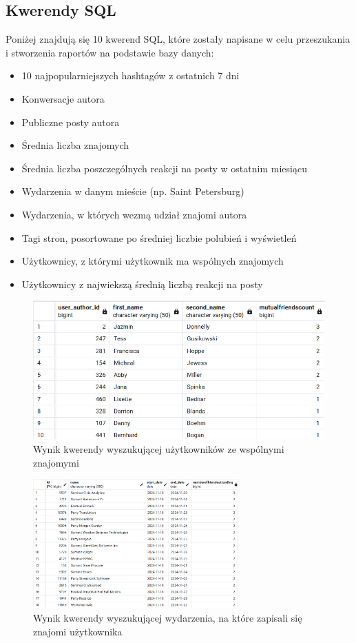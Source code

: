 \documentclass{article}
\begin{document}
\subsection{Kwerendy SQL}
\quad Poniżej znajdują się 10 kwerend SQL, które zostały napisane w celu przeszukania i stworzenia raportów na podstawie bazy danych:

\begin{itemize}
    \item 10 najpopularniejszych hashtagów z ostatnich 7 dni
    \item Konwersacje autora
    \item Publiczne posty autora
    \item Średnia liczba znajomych
    \item Średnia liczba poszczególnych reakcji na posty w ostatnim miesiącu
    \item Wydarzenia w danym mieście (np. Saint Petersburg)
    \item Wydarzenia, w których wezmą udział znajomi autora
    \item Tagi stron, posortowane po średniej liczbie polubień i wyświetleń
    \item Użytkownicy, z którymi użytkownik ma wspólnych znajomych
    \item Użytkownicy z najwiekszą średnią liczbą reakcji na posty
\end{itemize}

\begin{figure}[H]
    \centering
    \includegraphics[width=\textwidth]{images/mutual_friends_sql.png}
    \caption{Wynik kwerendy wyszukującej użytkowników ze wspólnymi znajomymi}
    \label{fig:sql_1}
\end{figure}

\begin{figure}[H]
    \centering
    \includegraphics[width=0.7\textwidth]{images/event_mutuals_sql.png}
    \caption{Wynik kwerendy wyszukującej wydarzenia, na które zapisali się znajomi użytkownika}
    \label{fig:sql_2}
\end{figure}
\end{document}
